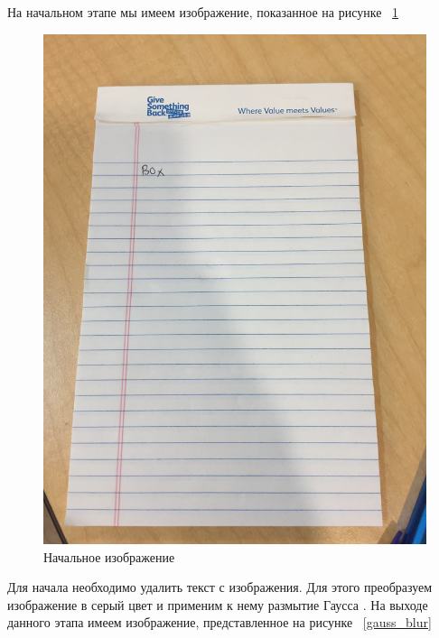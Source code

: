 На начальном этапе мы имеем изображение, показанное на рисунке ~\ref{input}

\begin{figure}
    \includegraphics[scale=0.05]{img/perspective/input.JPG}
    \caption{Начальное изображение}
    \label{input}
\end{figure}

Для начала необходимо удалить текст с изображения. Для этого преобразуем изображение в серый цвет и применим к нему размытие Гаусса \cite{gauss_blur}. На выходе данного этапа имеем изображение, представленное на рисунке ~\ref{gauss_blur}

